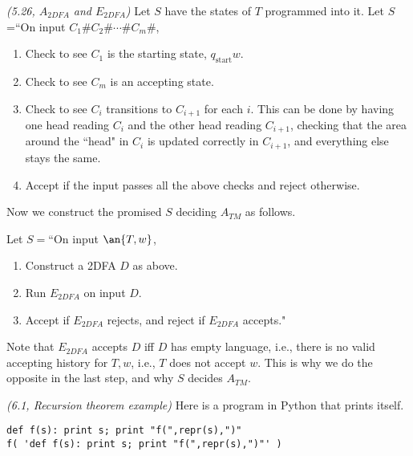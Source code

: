 \begin{problem}{\it(5.26, $A_{2DFA}$ and $E_{2DFA}$)}
%
Let $S$ have the states of $T$ programmed into it. Let $S$=``On input $C_1\#C_2\#\cdots \#C_m\#$,
\begin{enumerate}
\item
Check to see $C_1$ is the starting state, $q_{\text{start}}w$.
\item
Check to see $C_m$ is an accepting state.
\item
Check to see $C_i$ transitions to $C_{i+1}$ for each $i$. This can be done by having one head reading $C_i$ and the other head reading $C_{i+1}$, checking that the area around the ``head" in $C_i$ is updated correctly in $C_{i+1}$, and everything else stays the same.
\item Accept if the input passes all the above checks and reject otherwise.
\end{enumerate}

Now we construct the promised $S$ deciding $A_{TM}$ as follows. 

Let $S=$``On input $\an{T,w}$,
\begin{enumerate}
\item
Construct a 2DFA $D$ as above.
\item Run $E_{2DFA}$ on input $D$.
\item Accept if $E_{2DFA}$ rejects, and reject if $E_{2DFA}$ accepts."
\end{enumerate}
Note that $E_{2DFA}$ accepts $D$ iff $D$ has empty language, i.e., there is no valid accepting history for $T,w$, i.e., $T$ does not accept $w$. This is why we do the opposite in the last step, and why $S$ decides $A_{TM}$.
\end{problem}

\pagebreak

\begin{problem}{\it(6.1, Recursion theorem example)}
Here is a program in Python that prints itself.
\begin{lstlisting}
def f(s): print s; print "f(",repr(s),")"
f( 'def f(s): print s; print "f(",repr(s),")"' )
\end{lstlisting}
\end{problem}

\pagebreak

